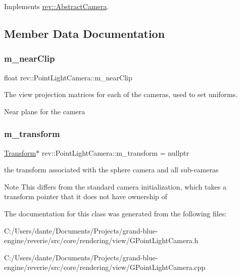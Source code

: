 Implements \mbox{\hyperlink{classrev_1_1_abstract_camera_aaa1843c3653515e93eecc2a255d32987}{rev\+::\+Abstract\+Camera}}.



\subsection{Member Data Documentation}
\mbox{\label{classrev_1_1_point_light_camera_a79b57ce810bf4f59058643886f7abca0}} 
\subsubsection{\texorpdfstring{m\_nearClip}{m\_nearClip}}
{\footnotesize\ttfamily float rev\+::\+Point\+Light\+Camera\+::m\+\_\+near\+Clip\hspace{0.3cm}{\ttfamily [protected]}}



The view projection matrices for each of the cameras, used to set uniforms. 

Near plane for the camera \mbox{\label{classrev_1_1_point_light_camera_a27b4f5ef37da48fb185f8afa2d1cd024}} 
\subsubsection{\texorpdfstring{m\_transform}{m\_transform}}
{\footnotesize\ttfamily \mbox{\hyperlink{classrev_1_1_transform}{Transform}}$\ast$ rev\+::\+Point\+Light\+Camera\+::m\+\_\+transform = nullptr\hspace{0.3cm}{\ttfamily [protected]}}



the transform associated with the sphere camera and all sub-\/cameras 

\begin{DoxyNote}{Note}
This differs from the standard camera initialization, which takes a transform pointer that it does not have ownership of 
\end{DoxyNote}


The documentation for this class was generated from the following files\+:\begin{DoxyCompactItemize}
\item 
C\+:/\+Users/dante/\+Documents/\+Projects/grand-\/blue-\/engine/reverie/src/core/rendering/view/G\+Point\+Light\+Camera.\+h\item 
C\+:/\+Users/dante/\+Documents/\+Projects/grand-\/blue-\/engine/reverie/src/core/rendering/view/G\+Point\+Light\+Camera.\+cpp\end{DoxyCompactItemize}
